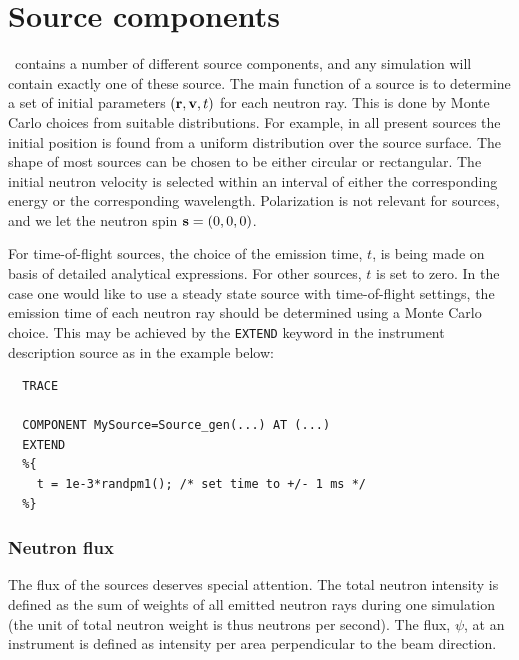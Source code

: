 
\chapter{Source components}
\label{c:source}

\MCS\ contains a number of different source components,
and any simulation will contain exactly one of these source.
The main function of a source is to determine a set of initial
parameters $({\bf r}, {\bf v}, t)$
for each neutron ray. This is done by Monte Carlo choices from
suitable distributions. For example, in all present sources
the initial position is
found from a uniform distribution over the source surface.
The shape of most sources can be chosen to be either circular or rectangular.
The initial neutron velocity is selected within an interval
of either the corresponding energy or the corresponding wavelength.
Polarization is not relevant for sources,
and we let the neutron spin ${\bf s}=(0,0,0)$.

For time-of-flight sources, the choice of the emission time, $t$,
is being made on basis of detailed analytical expressions.
For other sources, $t$ is set to zero.
In the case one would like to use a steady state source
with time-of-flight settings,
the emission time of each neutron ray should be determined using
a Monte Carlo choice. This may be achieved by
the \verb+EXTEND+ keyword in the instrument description source
as in the example below:

\begin{verbatim}
  TRACE

  COMPONENT MySource=Source_gen(...) AT (...)
  EXTEND
  %{
    t = 1e-3*randpm1(); /* set time to +/- 1 ms */
  %}
\end{verbatim}

\subsection{Neutron flux}
\label{s:neutron-flux}
The flux of the sources deserves special attention. The total neutron
intensity is defined as the sum of weights of all emitted neutron rays
during one simulation
(the unit of total neutron weight is thus neutrons per second).
The flux, $\psi$, at an instrument is defined as intensity per area perpendicular
to the beam direction.

